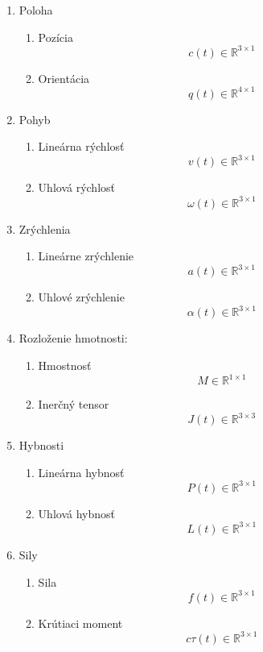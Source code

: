 \documentclass[paper=a4, fontsize=11pt]{scrartcl} %
\numberwithin{equation}{section} %
\numberwithin{figure}{section} %
\numberwithin{table}{section} %
\begin{document}
\begin{enumerate}
\item Poloha
	\begin{enumerate}	
	\item Pozícia $$ c(t) \in \mathbb{R}^{3 \times 1} $$
	\item Orientácia $$ q(t) \in \mathbb{R}^{4 \times 1} $$
	\end{enumerate}
	

\item Pohyb
	\begin{enumerate}
	\item Lineárna rýchlosť	$$ v(t) \in \mathbb{R}^{3 \times 1} $$
	\item Uhlová rýchlosť	$$ \omega(t) \in \mathbb{R}^{3 \times 1} $$
	\end{enumerate}
	

\item Zrýchlenia
	\begin{enumerate}
	\item Lineárne zrýchlenie	$$ a(t) \in \mathbb{R}^{3 \times 1} $$
	\item Uhlové zrýchlenie		$$ \alpha(t) \in \mathbb{R}^{3 \times 1} $$
	\end{enumerate}
	

\item Rozloženie hmotnosti:
	\begin{enumerate}
	\item Hmostnosť			$$ M \in \mathbb{R}^{1 \times 1} $$
	\item Inerčný tensor	$$ J(t) \in \mathbb{R}^{3 \times 3} $$
	\end{enumerate}
	

\item Hybnosti
	\begin{enumerate}
	\item Lineárna hybnosť	$$ P(t) \in \mathbb{R}^{3 \times 1} $$
	\item Uhlová hybnosť	$$ L(t) \in \mathbb{R}^{3 \times 1} $$
	\end{enumerate}
	

\item Sily
	\begin{enumerate}
	\item Sila				$$ f(t) \in \mathbb{R}^{3 \times 1} $$
	\item Krútiaci moment	$$ c\tau(t) \in \mathbb{R}^{3 \times 1} $$
	\end{enumerate}
\end{enumerate}
$ $
\end{document}

